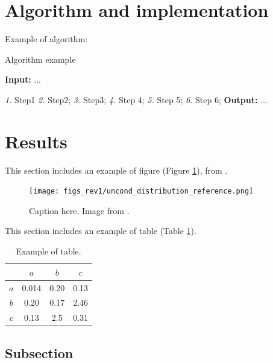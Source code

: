 \documentclass[a4paper,fleqn]{cas-sc}
\begin{document}
\section{Algorithm and implementation}

Example of algorithm:
\begin{algorithm}
  \caption{Algorithm example }
  
  \begin{algorithmic}
  \label{alg:Alg1}
  \State \textbf{Input:} ...
   \newline

 \Statex \textit{1.} Step1
  \Statex \textit{2.} Step2;
 \State \textit{3.}  Step3;
  \newline
   \State \textit{4.} Step 4;
   \State \textit{5.}  Step 5;
   \State \textit{6.} Step 6;
   \EndFor
  \EndFor 
  \newline
\State  \textbf{Output: } ... 
  \end{algorithmic} 
\end{algorithm} 


\section{Results}


This section includes an example of figure (Figure \ref{fig:Figure1}), from  \cite{de2021direct}.

\begin{figure}
\centering
\texttt{[image: figs\_rev1/uncond\_distribution\_reference.png]}
\caption{ Caption here. Image from \cite{de2021direct}.}
\label{fig:Figure1}
\end{figure}

This section includes an example of table (Table \ref{tab:Table1}).

\begin{table}
\centering
\caption{Example of table.}
\label{tab:Table1}
\begin{tabular}{ |c||c|c|c|} 
 \hline
     & $a$  &  $b$  &  $c$\\ 
 \hline 
 \hline
$a$ & 0.014 &  0.20    &   0.13  \\
\hline
$b$ & 0.20    &   0.17    &   2.46    \\
\hline
$c$ & 0.13    &   2.5     &   0.31   \\
\hline
\end{tabular} 
\end{table}


\subsection{Subsection}
\end{document}
